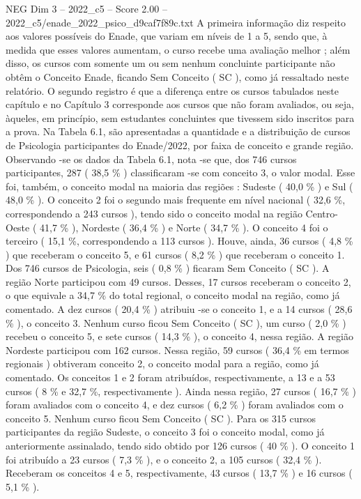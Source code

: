 \begin{textsample}{NEG Dim 3 – 2022\_c5 – Score 2.00 – 2022\_c5/enade\_2022\_psico\_d9caf7f89c.txt}
A primeira informação diz respeito aos valores possíveis do Enade, que variam em níveis de 1 a 5, sendo que, à medida que esses valores aumentam, o curso recebe uma avaliação melhor ; além disso, os cursos com somente um ou sem nenhum concluinte participante não obtêm o Conceito Enade, ficando Sem Conceito ( SC ), como já ressaltado neste relatório.
O segundo registro é que a diferença entre os cursos tabulados neste capítulo e no Capítulo 3 corresponde aos cursos que não foram avaliados, ou seja, àqueles, em princípio, sem estudantes concluintes que tivessem sido inscritos para a prova.
Na Tabela 6.1, são apresentadas a quantidade e a distribuição de cursos de Psicologia participantes do Enade/2022, por faixa de conceito e grande região.
Observando -se os dados da Tabela 6.1, nota -se que, dos 746 cursos participantes, 287 ( 38,5 \% ) classificaram -se com conceito 3, o valor modal.
Esse foi, também, o conceito modal na maioria das regiões : Sudeste ( 40,0 \% ) e Sul ( 48,0 \% ).
O conceito 2 foi o segundo mais frequente em nível nacional ( 32,6 \%, correspondendo a 243 cursos ), tendo sido o conceito modal na região Centro-Oeste ( 41,7 \% ), Nordeste ( 36,4 \% ) e Norte ( 34,7 \% ).
O conceito 4 foi o terceiro ( 15,1 \%, correspondendo a 113 cursos ).
Houve, ainda, 36 cursos ( 4,8 \% ) que receberam o conceito 5, e 61 cursos ( 8,2 \% ) que receberam o conceito 1.
Dos 746 cursos de Psicologia, seis ( 0,8 \% ) ficaram Sem Conceito ( SC ).
A região Norte participou com 49 cursos.
Desses, 17 cursos receberam o conceito 2, o que equivale a 34,7 \% do total regional, o conceito modal na região, como já comentado.
A dez cursos ( 20,4 \% ) atribuiu -se o conceito 1, e a 14 cursos ( 28,6 \% ), o conceito 3.
Nenhum curso ficou Sem Conceito ( SC ), um curso ( 2,0 \% ) recebeu o conceito 5, e sete cursos ( 14,3 \% ), o conceito 4, nessa região.
A região Nordeste participou com 162 cursos.
Nessa região, 59 cursos ( 36,4 \% em termos regionais ) obtiveram conceito 2, o conceito modal para a região, como já comentado.
Os conceitos 1 e 2 foram atribuídos, respectivamente, a 13 e a 53 cursos ( 8 \% e 32,7 \%, respectivamente ).
Ainda nessa região, 27 cursos ( 16,7 \% ) foram avaliados com o conceito 4, e dez cursos ( 6,2 \% ) foram avaliados com o conceito 5.
Nenhum curso ficou Sem Conceito ( SC ).
Para os 315 cursos participantes da região Sudeste, o conceito 3 foi o conceito modal, como já anteriormente assinalado, tendo sido obtido por 126 cursos ( 40 \% ).
O conceito 1 foi atribuído a 23 cursos ( 7,3 \% ), e o conceito 2, a 105 cursos ( 32,4 \% ).
Receberam os conceitos 4 e 5, respectivamente, 43 cursos ( 13,7 \% ) e 16 cursos ( 5,1 \% ).

\end{textsample}
